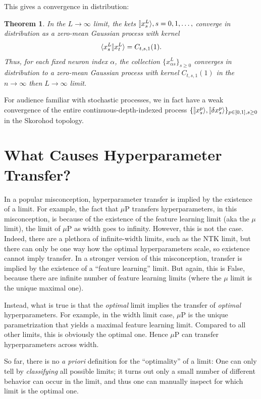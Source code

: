 \documentclass{article}
\theoremstyle{plain}
\newtheorem{theorem}{Theorem}[section]
\theoremstyle{definition}
\begin{document}
This gives a convergence in distribution:

\begin{theorem}
    In the $L \to \infty$ limit, the kets $\ket{x^L_s}, s = 0, 1, \ldots,$ converge in distribution as a zero-mean Gaussian process with kernel
    \[\braket{x^L_s}{x^L_t} = C_{t,s,1}(1).\]
    Thus, for each fixed neuron index $\alpha$, the collection $\{x^L_{\alpha s}\}_{s\ge 0}$ converges in distribution to a zero-mean Gaussian process with kernel $C_{t,s,1}(1)$ in the $n\to\infty$ then $L\to\infty$ limit.
\end{theorem}

For audience familiar with stochastic processes, we in fact have a weak convergence of the entire continuous-depth-indexed process $\{\ket{x^{p}_s}, \ket{\delta x^{p}_s}\}_{p \in [0, 1],s\ge0}$ in the Skorohod topology.

 

    

 
\section{What Causes Hyperparameter Transfer?}\label{sec:cause_hp}

In a popular misconception, hyperparameter transfer is implied by the existence of a limit.
For example, the fact that $\mu$P transfers hyperparameters, in this misconception, is because of the existence of the feature learning limit (aka the $\mu$ limit), the limit of $\mu$P as width goes to infinity.
However, this is not the case.
Indeed, there are a plethora of infinite-width limits, such as the NTK limit, but there can only be one way how the optimal hyperparameters scale, so existence cannot imply transfer.
In a stronger version of this misconception, transfer is implied by the existence of a ``feature learning'' limit. But again, this is False, because there are infinite number of feature learning limits (where the $\mu$ limit is the unique maximal one).

Instead, what is true is that the \emph{optimal} limit implies the transfer of \emph{optimal} hyperparameters.
For example, in the width limit case, $\mu$P is the unique parametrization that yields a maximal feature learning limit. Compared to all other limits, this is obviously the optimal one. Hence $\mu$P can transfer hyperparameters across width.

So far, there is no \emph{a priori} definition for the ``optimality'' of a limit: One can only tell by \emph{classifying} all possible limits; it turns out only a small number of different behavior can occur in the limit, and thus one can manually inspect for which limit is the optimal one.
\end{document}
